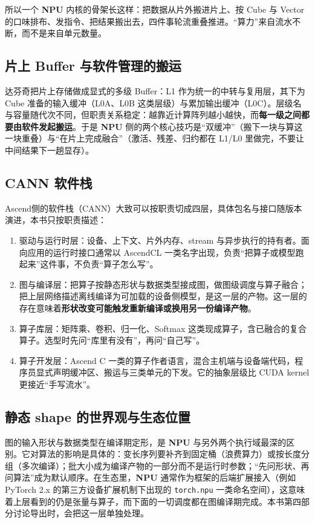 \documentclass[12pt,a4paper,fontset=fandol]{ctexbook}
\newcommand{\Tp}[1]{\texttt{#1}}
\newcommand{\Dom}[1]{\textsf{\bfseries #1}}
\newcommand{\NPU}{\Dom{NPU}}
\begin{document}
所以一个 \NPU{} 内核的骨架长这样：把数据从片外搬进片上、按 Cube 与 Vector 的口味排布、发指令、把结果搬出去，四件事轮流重叠推进。``算力''来自流水不断，而不是来自单元数量。

\subsection{片上 Buffer 与软件管理的搬运}

达芬奇把片上存储做成显式的多级 Buffer：L1 作为统一的中转与复用层，其下为 Cube 准备的输入缓冲（L0A、L0B 这类层级）与累加输出缓冲（L0C）。层级名与容量随代次不同，但职责关系稳定：越靠近计算阵列越小越快，而\textbf{每一级之间都要由软件发起搬运}。于是 \NPU{} 侧的两个核心技巧是``双缓冲''（搬下一块与算这一块重叠）与``在片上完成融合''（激活、残差、归约都在 L1/L0 里做完，不要让中间结果下一趟显存）。

\subsection{CANN 软件栈}

Ascend侧的软件栈（CANN）大致可以按职责切成四层，具体包名与接口随版本演进，本书只按职责描述：
\begin{enumerate}
\item 驱动与运行时层：设备、上下文、片外内存、stream 与异步执行的持有者。面向应用的运行时接口通常以 AscendCL 一类名字出现，负责``把算子或模型跑起来''这件事，不负责``算子怎么写''。
\item 图与编译层：把算子按静态形状与数据类型接成图，做图级调度与算子融合；把上层网络描述离线编译为可加载的设备侧模型，是这一层的产物。这一层的存在意味着\textbf{形状改变可能触发重新编译或换用另一份编译产物}。
\item 算子库层：矩阵乘、卷积、归一化、Softmax 这类现成算子，含已融合的复合算子。选型时先问``库里有没有''，再问``自己写''。
\item 算子开发层：Ascend C 一类的算子作者语言，混合主机端与设备端代码，程序员显式声明缓冲区、搬运与三类单元的下发。它的抽象层级比 CUDA kernel 更接近``手写流水''。
\end{enumerate}

\subsection{静态 shape 的世界观与生态位置}

图的输入形状与数据类型在编译期定形，是 \NPU{} 与另外两个执行域最深的区别。它对算法的影响是具体的：变长序列要补齐到固定桶（浪费算力）或按长度分组（多次编译）；批大小成为编译产物的一部分而不是运行时参数；``先问形状、再问算法''成为默认顺序。在生态里，\NPU{} 通常作为框架的后端扩展接入（例如 PyTorch 2.x 的第三方设备扩展机制下出现的 \Tp{torch.npu} 一类命名空间），这意味着上层看到的仍是张量与算子，而下面的一切调度都在图编译期完成。本书第四部分讨论导出时，会把这一层单独处理。
\end{document}

